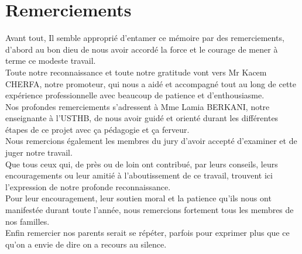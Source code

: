 \documentclass{report}
\begin{document}
 


\renewcommand{\contentsname}{Sommaire}
\tableofcontents
%


\chapter*{Remerciements}
\Large
Avant tout, Il semble approprié d'entamer ce mémoire par des remerciements, d’abord au bon dieu de nous avoir accordé la force et le courage de mener à terme ce modeste travail.\\

Toute notre reconnaissance et toute notre gratitude vont vers Mr Kacem CHERFA, notre promoteur, qui nous a aidé et accompagné tout au long de cette expérience professionnelle avec beaucoup de patience et d'enthousiasme.\\

Nos profondes remerciements s’adressent à Mme Lamia BERKANI, notre enseignante à l'USTHB, de nous avoir guidé et orienté durant les différentes étapes de ce projet avec ça pédagogie et ça ferveur.\\

Nous remercions également les membres du jury d’avoir accepté d’examiner et de juger notre travail.\\

Que tous ceux qui, de près ou de loin ont contribué, par leurs conseils, leurs
encouragements ou leur amitié à l’aboutissement de ce travail, trouvent ici
l’expression de notre profonde reconnaissance.\\

Pour leur encouragement, leur soutien moral et la patience qu’ils nous ont
manifestée durant toute l’année, nous remercions fortement tous les membres de
nos familles.\\

Enfin remercier nos parents serait se répéter, parfois pour exprimer plus que ce qu’on a envie de dire on a recours au silence.

\normalsize
\end{document}
